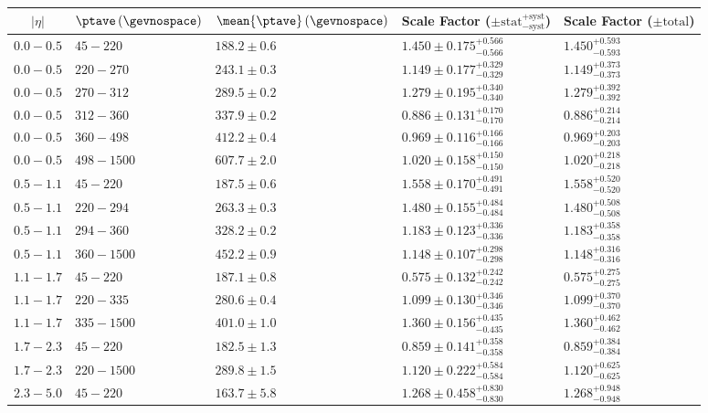 \begin{table}[!htb]
  \begin{center}
    \begin{tabular}{cllll}
      \toprule
$|\eta|$ & $\ptave\,(\gevnospace)$ & $\mean{\ptave}\,(\gevnospace)$ & Scale Factor ($\pm\text{stat}{}^{+\text{syst}}_{-\text{syst}}$) & Scale Factor ($\pm\text{total}$) \\
      \midrule
      $0.0 - 0.5$ & $45 - 220$ & $188.2 \pm 0.6$ & $1.450 \pm 0.175^{+0.566}_{-0.566}$ & $1.450^{+0.593}_{-0.593} $ \\
      $0.0 - 0.5$ & $220 - 270$ & $243.1 \pm 0.3$ & $1.149 \pm 0.177^{+0.329}_{-0.329}$ & $1.149^{+0.373}_{-0.373} $ \\
      $0.0 - 0.5$ & $270 - 312$ & $289.5 \pm 0.2$ & $1.279 \pm 0.195^{+0.340}_{-0.340}$ & $1.279^{+0.392}_{-0.392} $ \\
      $0.0 - 0.5$ & $312 - 360$ & $337.9 \pm 0.2$ & $0.886 \pm 0.131^{+0.170}_{-0.170}$ & $0.886^{+0.214}_{-0.214} $ \\
      $0.0 - 0.5$ & $360 - 498$ & $412.2 \pm 0.4$ & $0.969 \pm 0.116^{+0.166}_{-0.166}$ & $0.969^{+0.203}_{-0.203} $ \\
      $0.0 - 0.5$ & $498 - 1500$ & $607.7 \pm 2.0$ & $1.020 \pm 0.158^{+0.150}_{-0.150}$ & $1.020^{+0.218}_{-0.218} $ \\
      \midrule
      $0.5 - 1.1$ & $45 - 220$ & $187.5 \pm 0.6$ & $1.558 \pm 0.170^{+0.491}_{-0.491}$ & $1.558^{+0.520}_{-0.520} $ \\
      $0.5 - 1.1$ & $220 - 294$ & $263.3 \pm 0.3$ & $1.480 \pm 0.155^{+0.484}_{-0.484}$ & $1.480^{+0.508}_{-0.508} $ \\
      $0.5 - 1.1$ & $294 - 360$ & $328.2 \pm 0.2$ & $1.183 \pm 0.123^{+0.336}_{-0.336}$ & $1.183^{+0.358}_{-0.358} $ \\
      $0.5 - 1.1$ & $360 - 1500$ & $452.2 \pm 0.9$ & $1.148 \pm 0.107^{+0.298}_{-0.298}$ & $1.148^{+0.316}_{-0.316} $ \\
      \midrule
      $1.1 - 1.7$ & $45 - 220$ & $187.1 \pm 0.8$ & $0.575 \pm 0.132^{+0.242}_{-0.242}$ & $0.575^{+0.275}_{-0.275} $ \\
      $1.1 - 1.7$ & $220 - 335$ & $280.6 \pm 0.4$ & $1.099 \pm 0.130^{+0.346}_{-0.346}$ & $1.099^{+0.370}_{-0.370} $ \\
      $1.1 - 1.7$ & $335 - 1500$ & $401.0 \pm 1.0$ & $1.360 \pm 0.156^{+0.435}_{-0.435}$ & $1.360^{+0.462}_{-0.462} $ \\
      \midrule
      $1.7 - 2.3$ & $45 - 220$ & $182.5 \pm 1.3$ & $0.859 \pm 0.141^{+0.358}_{-0.358}$ & $0.859^{+0.384}_{-0.384} $ \\
      $1.7 - 2.3$ & $220 - 1500$ & $289.8 \pm 1.5$ & $1.120 \pm 0.222^{+0.584}_{-0.584}$ & $1.120^{+0.625}_{-0.625} $ \\
      \midrule
      $2.3 - 5.0$ & $45 - 220$ & $163.7 \pm 5.8$ & $1.268 \pm 0.458^{+0.830}_{-0.830}$ & $1.268^{+0.948}_{-0.948} $ \\
      \bottomrule
    \end{tabular}
  \end{center}
\end{table}

\clearpage

\cleardoublepage
